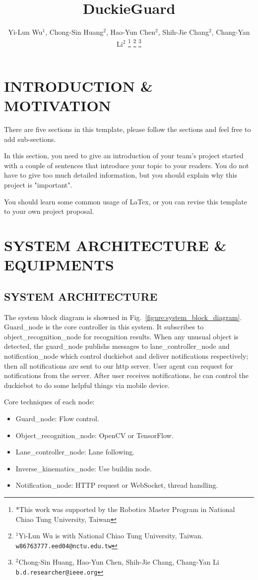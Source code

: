 \documentclass[letterpaper, 10 pt, conference]{ieeeconf}  %
\title{\LARGE \bf
DuckieGuard
}
\author{Yi-Lun Wu$^{1}$, Chong-Sin Huang$^{2}$, Hao-Yun Chen$^{2}$, Shih-Jie Chang$^{2}$, Chang-Yan Li$^{2}$%
\thanks{*This work was supported by the Robotics Master Program in National Chiao Tung University, Taiwan}%
\thanks{$^{1}$Yi-Lun Wu is with National Chiao Tung University, Taiwan.
        {\tt\small w86763777.eed04@nctu.edu.tw}}%
\thanks{$^{2}$Chong-Sin Huang, Hao-Yun Chen, Shih-Jie Chang, Chang-Yan Li
        {\tt\small b.d.researcher@ieee.org}}%
}
\begin{document}
\maketitle
\pagestyle{empty}

\section{INTRODUCTION \& MOTIVATION}
There are five sections in this template, please follow the sections and feel free to add sub-sections. 

In this section, you need to give an introduction of your team's project started with a couple of sentences that introduce your topic to your readers. You do not have to give too much detailed information, but you should explain why this project is "important".

You should learn some common usage of LaTex, or you can revise this template to your own project proposal.

\section{SYSTEM ARCHITECTURE \& EQUIPMENTS}
\label{section:system_architecture}
\subsection{SYSTEM ARCHITECTURE}
The system block diagram is showned in Fig.~\ref{figure:system_block_diagram}.
Guard\_node is the core controller in this system. 
It subscribes to object\_recognition\_node for recognition results.
When any unusual object is detected, the guard\_node publishs messages
to lane\_controller\_node and notification\_node which control
duckiebot and deliver notifications respectively; then all notifications are sent to
our http server. User agent can request for notifications from the server.
After user receives notifications,
he can control the duckiebot to do some helpful things via mobile device.

Core techniques of each node:
\begin{itemize}
  \item Guard\_node: Flow control.
  \item Object\_recognition\_node: OpenCV or TensorFlow.
  \item Lane\_controller\_node: Lane following.
  \item Inverse\_kinematics\_node: Use buildin node.
  \item Notification\_node: HTTP request or WebSocket, thread handling.
\end{itemize}
\end{document}
